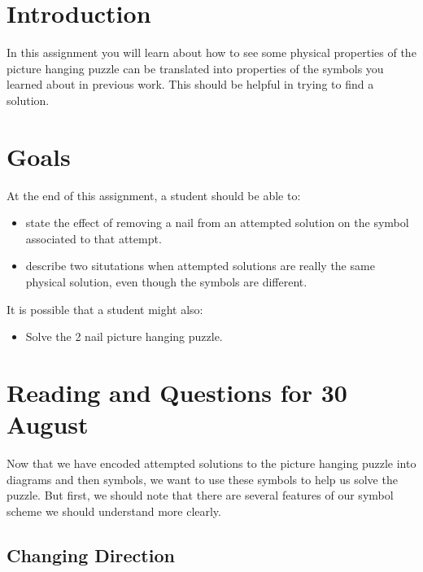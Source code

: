 \documentclass[12pt,letterpaper]{article}
\theoremstyle{definition}
\begin{document}
\setlength{\parskip}{1ex plus 0.5ex minus 0.2ex}
\setlength{\parindent}{0pt}

\pagestyle{fancy}
\cfoot{}

\section*{Introduction}
In this assignment you will learn about how to see some physical properties of the picture hanging puzzle can be translated into properties of the symbols you learned about in previous work.
This should be helpful in trying to find a solution.

\section*{Goals}
At the end of this assignment, a student should be able to:
\begin{itemize}
\item state the effect of removing a nail from an attempted solution on the symbol associated to that attempt.
\item describe two situtations when attempted solutions are really the same physical solution, even though the symbols are different.
\end{itemize}
It is possible that a student might also:
\begin{itemize}
\item Solve the 2 nail picture hanging puzzle.
\end{itemize}

\section*{Reading and Questions for 30 August}

Now that we have encoded attempted solutions to the picture hanging puzzle into diagrams and then symbols, we want to use these symbols to help us solve the puzzle.
But first, we should note that there are several features of our symbol scheme we should understand more clearly.

\subsection*{Changing Direction}
\end{document}
